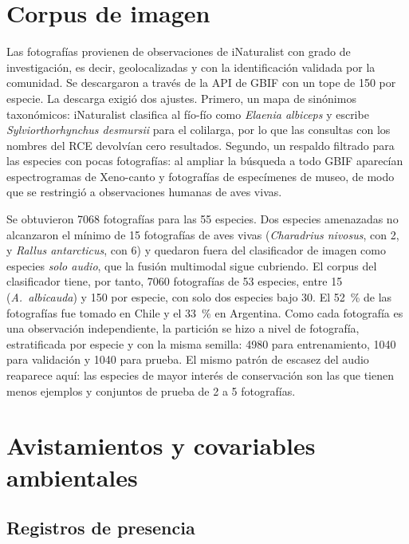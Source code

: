 \section{Corpus de imagen}\label{sec:corpus-imagen}

Las fotografías provienen de observaciones de iNaturalist con grado de
investigación, es decir, geolocalizadas y con la identificación validada por
la comunidad. Se descargaron a través de la API de GBIF \citep{inat2026gbif}
con un tope de 150 por especie. La descarga exigió dos ajustes. Primero, un
mapa de sinónimos taxonómicos: iNaturalist clasifica al fío-fío como
\textit{Elaenia albiceps} y escribe \textit{Sylviorthorhynchus desmursii}
para el colilarga, por lo que las consultas con los nombres del RCE
devolvían cero resultados. Segundo, un respaldo filtrado para las especies
con pocas fotografías: al ampliar la búsqueda a todo GBIF aparecían
espectrogramas de Xeno-canto y fotografías de especímenes de museo, de modo
que se restringió a observaciones humanas de aves vivas.

Se obtuvieron \num{7068} fotografías para las 55 especies. Dos especies
amenazadas no alcanzaron el mínimo de 15 fotografías de aves vivas
(\textit{Charadrius nivosus}, con 2, y \textit{Rallus antarcticus}, con 6)
y quedaron fuera del clasificador de imagen como especies \emph{solo audio},
que la fusión multimodal sigue cubriendo. El corpus del clasificador tiene,
por tanto, \num{7060} fotografías de 53 especies, entre 15
(\textit{A.~albicauda}) y 150 por especie, con solo dos especies bajo 30. El
\SI{52}{\percent} de las fotografías fue tomado en Chile y el
\SI{33}{\percent} en Argentina. Como cada fotografía es una observación
independiente, la partición se hizo a nivel de fotografía, estratificada por
especie y con la misma semilla: \num{4980} para entrenamiento, \num{1040}
para validación y \num{1040} para prueba. El mismo patrón de escasez del
audio reaparece aquí: las especies de mayor interés de conservación son las
que tienen menos ejemplos y conjuntos de prueba de 2 a 5 fotografías.

\section{Avistamientos y covariables ambientales}\label{sec:datos-sdm}

\subsection{Registros de presencia}


